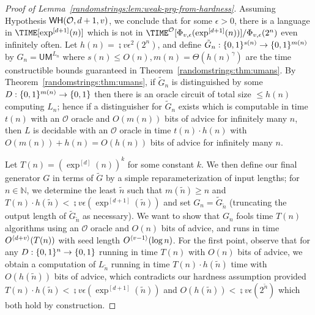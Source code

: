 \begin{proof}[Proof of Lemma~\ref{randomstrings:lem:weak-prg-from-hardness}]


Assuming Hypothesis $\mathsf{WH}(\mathcal{O},d+1,v)$, we conclude that for some $\epsilon > 0$, there is a language in $\TIME[\exp^{[d+1]}(n)]$ which is not in $\TIME^{\mathcal{O}}[\semi{v}{\epsilon}(\exp^{[d+1]}(n))]/\semi{v}{\epsilon}(2^n)$ even infinitely often. Let $h(n) = \semi{v}{\epsilon^2}(2^n)$, and define $\tilde{G}_n: \{0,1\}^{s(n)} \to \{0,1\}^{m(n)}$ by $G_n = \mathsf{UM}^{L_n}$ where $s(n) \leq O(n), m(n) = \Theta( h(n)^\gamma)$ are the time constructible bounds guaranteed in Theorem~\ref{randomstrings:thm:umans}. By Theorem~\ref{randomstrings:thm:umans}, if $\tilde{G}_n$ is distinguished by some $D: \{0,1\}^{m(n)} \to \{0,1\}$ then there is an oracle circuit of total size $\leq h(n)$ computing $L_n$; hence if a distinguisher for $\tilde{G}_n$ exists which is computable in time $t(n)$ with an $\mathcal{O}$ oracle and $O(m(n))$ bits of advice for infinitely many $n$, then $L$ is decidable with an $\mathcal{O}$ oracle in time $t(n) \cdot h(n)$ with $O(m(n)) + h(n) = O(h(n))$ bits of advice for infinitely many $n$.

Let $T(n) = (\exp^{[d]}(n))^{k}$ for some constant $k$. We then define our final generator $G$ in terms of $\tilde{G}$ by a simple reparameterization of input lengths; for $n \in \mathbb{N}$, we determine the least $\tilde{n}$ such that $m(\tilde{n}) \geq n$ and  $T(n) \cdot h(\tilde{n}) < \semi{v}{\epsilon}(\exp^{[d+1]}(\tilde{n}))$
and set $G_n = \tilde{G}_{\tilde{n}}$ (truncating the output length of $\tilde{G}_{\tilde{n}}$ as necessary). 
We want to show that $G_n$ fools time $T(n)$ algorithms using an $\mathcal{O}$ oracle and $O(n)$ bits of advice, and runs in time $O^{\langle d+v \rangle}(T(n))$ with seed length $O^{\langle v-1 \rangle}(\log n)$. For the first point, observe that for any $D: \{0,1\}^n \to \{0,1\}$ running in time $T(n)$ with $O(n)$ bits of advice, we obtain a computation of $L_{\tilde{n}}$ running in time $T(n) \cdot h(\tilde{n}) $ time with $O(h(\tilde{n}))$ bits of advice, which contradicts our hardness assumption provided $T(n) \cdot h(\tilde{n}) < \semi{v}{\epsilon}(\exp^{[d+1]}(\tilde{n}))$ and $O(h(\tilde{n})) < \semi{v}{\epsilon}(2^{\tilde{n}})$ which both hold by construction.


\end{proof}
